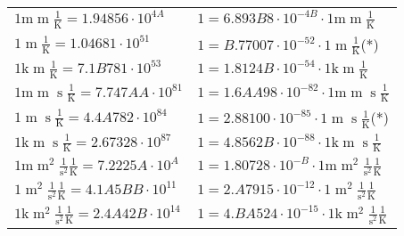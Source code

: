 \begin{center}
\begin{longtable}{l l}
{\color{gray}$1 \bm{\mathrm{ m}}{\operatorname{m}}{}{}\frac1{\operatorname{K}} = 1.94856\cdot10^{4A} $}   & {\color{gray}$ 1 = 6.893B8\cdot10^{-4B} \cdot 1 \bm{\mathrm{ m}}{\operatorname{m}}{}{}\frac1{\operatorname{K}}$}  \\
{\color{black}$1 \bm{\mathrm{ }}{\operatorname{m}}{}{}\frac1{\operatorname{K}} = 1.04681\cdot10^{51} $}   & {\color{black}$ 1 = B.77007\cdot10^{-52} \cdot 1 \bm{\mathrm{ }}{\operatorname{m}}{}{}\frac1{\operatorname{K}}$}\quad(*)\\
{\color{gray}$1 \bm{\mathrm{ k}}{\operatorname{m}}{}{}\frac1{\operatorname{K}} = 7.1B781\cdot10^{53} $}   & {\color{gray}$ 1 = 1.8124B\cdot10^{-54} \cdot 1 \bm{\mathrm{ k}}{\operatorname{m}}{}{}\frac1{\operatorname{K}}$}  \\
{\color{gray}$1 \bm{\mathrm{ m}}{\operatorname{m}}{\operatorname{s}}{}\frac1{\operatorname{K}} = 7.747AA\cdot10^{81} $}   & {\color{gray}$ 1 = 1.6AA98\cdot10^{-82} \cdot 1 \bm{\mathrm{ m}}{\operatorname{m}}{\operatorname{s}}{}\frac1{\operatorname{K}}$}  \\
{\color{black}$1 \bm{\mathrm{ }}{\operatorname{m}}{\operatorname{s}}{}\frac1{\operatorname{K}} = 4.4A782\cdot10^{84} $}   & {\color{black}$ 1 = 2.88100\cdot10^{-85} \cdot 1 \bm{\mathrm{ }}{\operatorname{m}}{\operatorname{s}}{}\frac1{\operatorname{K}}$}\quad(*)\\
{\color{gray}$1 \bm{\mathrm{ k}}{\operatorname{m}}{\operatorname{s}}{}\frac1{\operatorname{K}} = 2.67328\cdot10^{87} $}   & {\color{gray}$ 1 = 4.8562B\cdot10^{-88} \cdot 1 \bm{\mathrm{ k}}{\operatorname{m}}{\operatorname{s}}{}\frac1{\operatorname{K}}$}  \\
{\color{gray}$1 \bm{\mathrm{ m}}{\operatorname{m}^2}\frac1{\operatorname{s}^2}{}\frac1{\operatorname{K}} = 7.2225A\cdot10^{A} $}   & {\color{gray}$ 1 = 1.80728\cdot10^{-B} \cdot 1 \bm{\mathrm{ m}}{\operatorname{m}^2}\frac1{\operatorname{s}^2}{}\frac1{\operatorname{K}}$}  \\
{\color{black}$1 \bm{\mathrm{ }}{\operatorname{m}^2}\frac1{\operatorname{s}^2}{}\frac1{\operatorname{K}} = 4.1A5BB\cdot10^{11} $}   & {\color{black}$ 1 = 2.A7915\cdot10^{-12} \cdot 1 \bm{\mathrm{ }}{\operatorname{m}^2}\frac1{\operatorname{s}^2}{}\frac1{\operatorname{K}}$}  \\
{\color{gray}$1 \bm{\mathrm{ k}}{\operatorname{m}^2}\frac1{\operatorname{s}^2}{}\frac1{\operatorname{K}} = 2.4A42B\cdot10^{14} $}   & {\color{gray}$ 1 = 4.BA524\cdot10^{-15} \cdot 1 \bm{\mathrm{ k}}{\operatorname{m}^2}\frac1{\operatorname{s}^2}{}\frac1{\operatorname{K}}$}  \\

\end{longtable}
\end{center}
